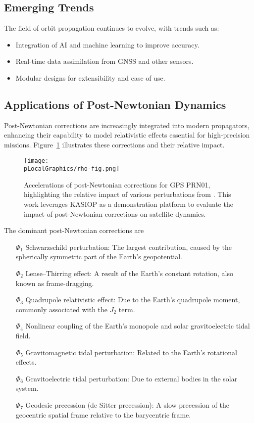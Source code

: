 \subsection{Emerging Trends}
The field of orbit propagation continues to evolve, with trends such as:
\begin{itemize}
    \item Integration of AI and machine learning to improve accuracy.
    \item Real-time data assimilation from GNSS and other sensors.
    \item Modular designs for extensibility and ease of use.
\end{itemize}

\subsection{Applications of Post-Newtonian Dynamics}
Post-Newtonian corrections are increasingly integrated into modern propagators, enhancing their capability to model relativistic effects essential for high-precision missions. Figure~\ref{fig:pn_corrections} illustrates these corrections and their relative impact.

\begin{figure}[htbp]
    \centering
    \texttt{[image: \\pLocalGraphics/rho-fig.png]}
    \caption{Accelerations of post-Newtonian corrections for GPS PRN01, highlighting the relative impact of various perturbations from \cite{roh2018numerical}. This work leverages KASIOP as a demonstration platform to evaluate the impact of post-Newtonian corrections on satellite dynamics.}
    \label{fig:pn_corrections}
\end{figure}

The dominant post-Newtonian corrections are
\begin{itemize}
    \item[\(\Phi_1\)] Schwarzschild perturbation: The largest contribution, caused by the spherically symmetric part of the Earth's geopotential.
    \item[\(\Phi_2\)] Lense–Thirring effect: A result of the Earth's constant rotation, also known as frame-dragging.
    \item[\(\Phi_3\)] Quadrupole relativistic effect: Due to the Earth's quadrupole moment, commonly associated with the \(J_2\) term.
    \item[\(\Phi_4\)] Nonlinear coupling of the Earth's monopole and solar gravitoelectric tidal field.
    \item[\(\Phi_5\)] Gravitomagnetic tidal perturbation: Related to the Earth's rotational effects.
    \item[\(\Phi_6\)] Gravitoelectric tidal perturbation: Due to external bodies in the solar system.
    \item[\(\Phi_7\)] Geodesic precession (de Sitter precession): A slow precession of the geocentric spatial frame relative to the barycentric frame.
\end{itemize}

\endinput  %
